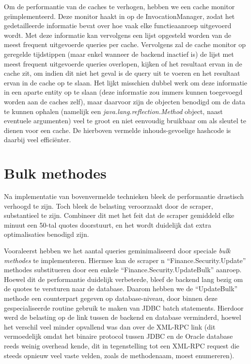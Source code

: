 Om de performantie van de caches te verhogen, hebben we een cache monitor ge\"implementeerd. Deze monitor haakt in op de InvocationManager, zodat het gedetailleerde informatie bevat over hoe vaak elke functieaanroep uitgevoerd wordt. Met deze informatie kan vervolgens een lijst opgesteld worden van de meest frequent uitgevoerde queries per cache. Vervolgens zal de cache monitor op geregelde tijdstippen (maar enkel wanneer de backend inactief is) de lijst met meest frequent uitgevoerde queries overlopen, kijken of het resultaat ervan in de cache zit, om indien dit niet het geval is de query uit te voeren en het resultaat ervan in de cache op te slaan.
Het lijkt misschien dubbel werk om deze informatie in een aparte entity op te slaan (deze informatie zou immers kunnen toegevoegd worden aan de caches zelf), maar daarvoor zijn de objecten benodigd om de data te kunnen ophalen (namelijk een \emph{java.lang.reflection.Method} object, naast eventuele argumenten) veel te groot en niet eenvoudig bruikbaar om als sleutel te dienen voor een cache. De hierboven vermelde inhouds-gevoelige hashcode is daarbij veel effici\"enter.


\section{Bulk methodes}

Na implementatie van bovenvermelde technieken bleek de performantie drastisch verhoogd te zijn. Toch bleek de belasting veroorzaakt door de scraper, substantieel te zijn. Combineer dit met het feit dat de scraper gemiddeld elke minuut een 50-tal quotes doorstuurt, en het wordt duidelijk dat extra optimalisaties benodigd zijn.

Vooraleerst hebben we het aantal queries geminimaliseerd door speciale \emph{bulk methodes} te implementeren. Hiermee kan de scraper n ``Finance.Security.Update'' methodes substitueren door een enkele ``Finance.Security.UpdateBulk'' aanroep. Hoewel dit de performantie duidelijk verbeterde, bleef de backend lang bezig om de quotes te versturen naar de database. Daarom hebben we de ``UpdateBulk'' methode een counterpart gegeven op database-niveau, door binnen deze gespecialiseerde routine gebruik te maken van JDBC batch statements. Hierdoor werd de belasting op de link tussen de backend en database verminderd, hoewel het verschil veel minder opvallend was dan over de XML-RPC link (dit vermoedelijk omdat het binaire protocol tussen JDBC en de Oracle database reeds weinig overhead kende, dit in tegenstelling tot een XML-RPC request die steeds opnieuw veel vaste velden, zoals de methodenaam, moest enumereren).



